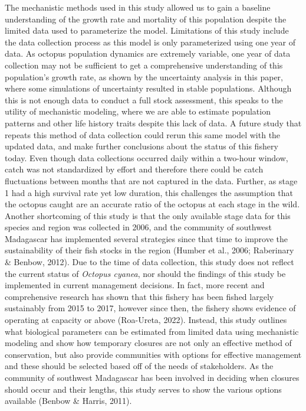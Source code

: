 \documentclass[
]{article}
\begin{document}
The mechanistic methods used in this study allowed us to gain a baseline understanding of the growth rate and mortality of this population despite the limited data used to parameterize the model. Limitations of this study include the data collection process as this model is only parameterized using one year of data. As octopus population dynamics are extremely variable, one year of data collection may not be sufficient to get a comprehensive understanding of this population's growth rate, as shown by the uncertainty analysis in this paper, where some simulations of uncertainty resulted in stable populations. Although this is not enough data to conduct a full stock assessment, this speaks to the utility of mechanistic modeling, where we are able to estimate population patterns and other life history traits despite this lack of data. A future study that repeats this method of data collection could rerun this same model with the updated data, and make further conclusions about the status of this fishery today. Even though data collections occurred daily within a two-hour window, catch was not standardized by effort and therefore there could be catch fluctuations between months that are not captured in the data. Further, as stage 1 had a high survival rate yet low duration, this challenges the assumption that the octopus caught are an accurate ratio of the octopus at each stage in the wild. Another shortcoming of this study is that the only available stage data for this species and region was collected in 2006, and the community of southwest Madagascar has implemented several strategies since that time to improve the sustainability of their fish stocks in the region (Humber et al., 2006; Raberinary \& Benbow, 2012). Due to the time of data collection, this study does not reflect the current status of \emph{Octopus cyanea}, nor should the findings of this study be implemented in current management decisions. In fact, more recent and comprehensive research has shown that this fishery has been fished largely sustainably from 2015 to 2017, however since then, the fishery shows evidence of operating at capacity or above (Roa-Ureta, 2022). Instead, this study outlines what biological parameters can be estimated from limited data using mechanistic modeling and show how temporary closures are not only an effective method of conservation, but also provide communities with options for effective management and these should be selected based off of the needs of stakeholders. As the community of southwest Madagascar has been involved in deciding when closures should occur and their lengths, this study serves to show the various options available (Benbow \& Harris, 2011).
\end{document}
